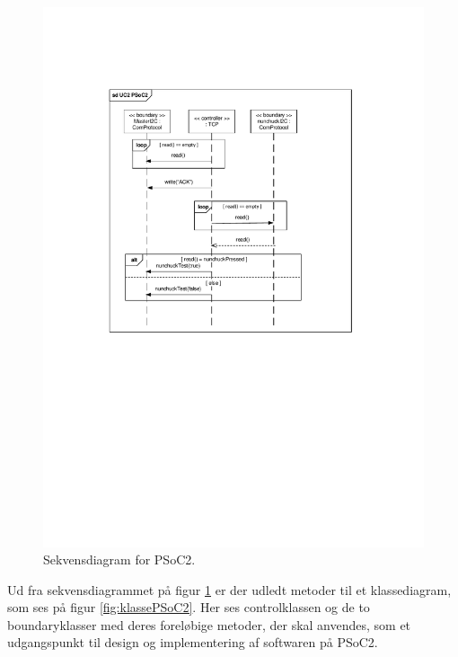 \begin{figure}[H]
	\centering
	\includegraphics[trim = {3cm 0cm 3.8cm 4.4cm}, clip = true, width=\textwidth] {Systemarkitektur/images/SekvensdiagramPSoC2.pdf}
	\caption{Sekvensdiagram for PSoC2.}
	\label{fig:sekvensPSoC2}
\end{figure}

Ud fra sekvensdiagrammet på figur \ref{fig:sekvensPSoC2} er der udledt metoder til et klassediagram, som ses på figur \ref{fig:klassePSoC2}. Her ses controlklassen og de to boundaryklasser med deres foreløbige metoder, der skal anvendes, som et udgangspunkt til design og implementering af softwaren på PSoC2. 

